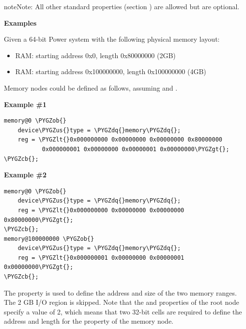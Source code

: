 \documentclass[a4paper,10pt,oneside]{sphinxmanual}
\def\PYGZus{\char`\_}
\def\PYGZob{\char`\{}
\def\PYGZcb{\char`\}}
\def\PYGZlt{\char`\<}
\def\PYGZgt{\char`\>}
\def\PYGZdq{\char`\"}
\begin{document}
\begin{notice}{note}{Note:}
All other standard properties (section
{\hyperref[devicetree\string-basics:sect\string-standard\string-properties]{}}) are allowed but are optional.
\end{notice}

\textbf{Examples}

Given a 64-bit Power system with the following physical memory layout:
\begin{itemize}
\item {} 
RAM: starting address 0x0, length 0x80000000 (2GB)

\item {} 
RAM: starting address 0x100000000, length 0x100000000 (4GB)

\end{itemize}

Memory nodes could be defined as follows, assuming 
and .

\textbf{Example \#1}

\begin{Verbatim}[commandchars=\\\{\}]
memory@0 \PYGZob{}
    device\PYGZus{}type = \PYGZdq{}memory\PYGZdq{};
    reg = \PYGZlt{}0x000000000 0x00000000 0x00000000 0x80000000
           0x000000001 0x00000000 0x00000001 0x00000000\PYGZgt{};
\PYGZcb{};
\end{Verbatim}

\textbf{Example \#2}

\begin{Verbatim}[commandchars=\\\{\}]
memory@0 \PYGZob{}
    device\PYGZus{}type = \PYGZdq{}memory\PYGZdq{};
    reg = \PYGZlt{}0x000000000 0x00000000 0x00000000 0x80000000\PYGZgt{};
\PYGZcb{};
memory@100000000 \PYGZob{}
    device\PYGZus{}type = \PYGZdq{}memory\PYGZdq{};
    reg = \PYGZlt{}0x000000001 0x00000000 0x00000001 0x00000000\PYGZgt{};
\PYGZcb{};
\end{Verbatim}

The  property is used to define the address and size of the two
memory ranges. The 2 GB I/O region is skipped. Note that the
 and  properties of the root node specify a
value of 2, which means that two 32-bit cells are required to define the
address and length for the  property of the memory node.
\end{document}
